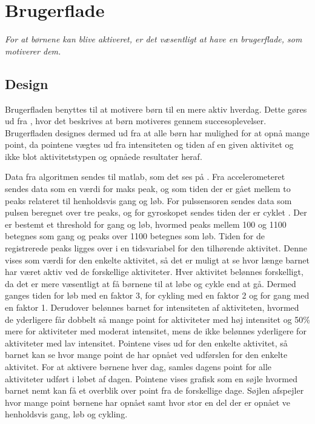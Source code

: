 \section{Brugerflade}
\textit{For at børnene kan blive aktiveret, er det væsentligt at have en brugerflade, som motiverer dem.}
\subsection{Design}
Brugerfladen benyttes til at motivere børn til en mere aktiv hverdag. Dette gøres ud fra , hvor det beskrives at børn motiveres gennem succesoplevelser. Brugerfladen designes dermed ud fra at alle børn har mulighed for at opnå mange point, da pointene vægtes ud fra intensiteten og tiden af en given aktivitet og ikke blot aktivitetstypen og opnåede resultater heraf.

Data fra algoritmen sendes til matlab, som det ses på . Fra accelerometeret sendes data som en værdi for maks peak, og som tiden der er gået mellem to peaks relateret til henholdsvis gang og løb. For pulssensoren sendes data som pulsen beregnet over tre peaks, og for gyroskopet sendes tiden der er cyklet . 
Der er bestemt et threshold for gang og løb, hvormed peaks mellem 100 og 1100 betegnes som gang og peaks over 1100 betegnes som løb. Tiden for de registrerede peaks ligges over i en tidsvariabel for den tilhørende aktivitet. Denne vises som værdi for den enkelte aktivitet, så det er muligt at se hvor længe barnet har været aktiv ved de forskellige aktiviteter. \newline
Hver aktivitet belønnes forskelligt, da det er mere væsentligt at få børnene til at løbe og cykle end at gå. Dermed ganges tiden for løb med en faktor 3, for cykling med en faktor 2 og for gang med en faktor 1. Derudover belønnes barnet for intensiteten af aktiviteten, hvormed de yderligere får dobbelt så mange point for aktiviteter med høj intensitet og 50\% mere for aktiviteter med moderat intensitet, mens de ikke belønnes yderligere for aktiviteter med lav intensitet. Pointene vises ud for den enkelte aktivitet, så barnet kan se hvor mange point de har opnået ved udførslen for den enkelte aktivitet.\newline
For at aktivere børnene hver dag, samles dagens point for alle aktiviteter udført i løbet af dagen. Pointene vises grafisk som en søjle hvormed barnet nemt kan få et overblik over point fra de forskellige dage. Søjlen afspejler hvor mange point børnene har opnået samt hvor stor en del der er opnået ve henholdsvis gang, løb og cykling. 

